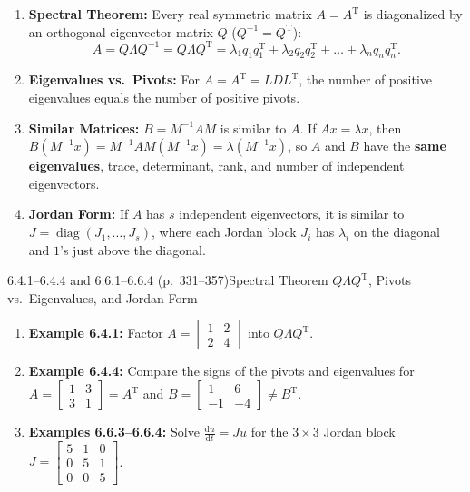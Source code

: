 \documentclass[11pt,a4paper,openany,oneside]{book}
\def\vect#1{#1}%
\def\mathbf#1{#1}%
\newcommand{\term}[1]{\textbf{\color{teal}#1}}
\newcommand{\vect}[1]{\mathbf{#1}}
\newcommand{\diff}{\mathrm{d}}
\newcommand{\T}{\mathrm{T}}
\numberwithin{equation}{chapter}
\begin{document}
\begin{result}
\begin{enumerate}
\item \textbf{Spectral Theorem:} Every real symmetric matrix $A = A^\T$ is diagonalized by an orthogonal eigenvector matrix $Q$ ($Q^{-1} = Q^\T$):
\begin{equation}
A = Q\Lambda Q^{-1} = Q\Lambda Q^\T = \lambda_1\vect{q}_1\vect{q}_1^\T + \lambda_2\vect{q}_2\vect{q}_2^\T + \dots + \lambda_n\vect{q}_n\vect{q}_n^\T.
\end{equation}
\item \textbf{Eigenvalues vs.\ Pivots:} For $A = A^\T = LDL^\T$, the number of positive eigenvalues equals the number of positive pivots.
\item \textbf{Similar Matrices:} $B = M^{-1}AM$ is similar to $A$. If $A\vect{x} = \lambda\vect{x}$, then $B(M^{-1}\vect{x}) = M^{-1}AM(M^{-1}\vect{x}) = \lambda(M^{-1}\vect{x})$, so $A$ and $B$ have the \term{same eigenvalues}, trace, determinant, rank, and number of independent eigenvectors.
\item \textbf{Jordan Form:} If $A$ has $s$ independent eigenvectors, it is similar to $J = \operatorname{diag}(J_1, \dots, J_s)$, where each Jordan block $J_i$ has $\lambda_i$ on the diagonal and $1$'s just above the diagonal.
\end{enumerate}
\end{result}

\begin{example}{6.4.1--6.4.4 and 6.6.1--6.6.4 (p.\ 331--357)}{Spectral Theorem $Q\Lambda Q^\T$, Pivots vs.\ Eigenvalues, and Jordan Form}
\begin{enumerate}
\item \textbf{Example 6.4.1:} Factor $A = \begin{bmatrix}1 & 2\\2 & 4\end{bmatrix}$ into $Q\Lambda Q^\T$.
\item \textbf{Example 6.4.4:} Compare the signs of the pivots and eigenvalues for $A = \begin{bmatrix}1 & 3\\3 & 1\end{bmatrix} = A^\T$ and $B = \begin{bmatrix}1 & 6\\-1 & -4\end{bmatrix} \neq B^\T$.
\item \textbf{Examples 6.6.3--6.6.4:} Solve $\frac{\diff\vect{u}}{\diff t} = J\vect{u}$ for the $3\times 3$ Jordan block $J = \begin{bmatrix}5&1&0\\0&5&1\\0&0&5\end{bmatrix}$.
\end{enumerate}
\end{example}
\end{document}
